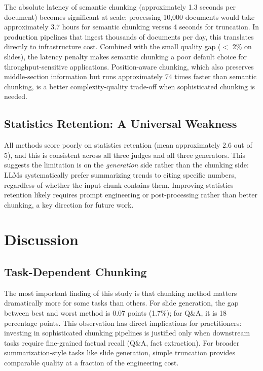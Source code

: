 \documentclass{ieeeaccess}
\begin{document}
The absolute latency of semantic chunking (approximately 1.3 seconds per document) becomes significant at scale: processing 10,000 documents would take approximately 3.7 hours for semantic chunking versus 4 seconds for truncation. In production pipelines that ingest thousands of documents per day, this translates directly to infrastructure cost. Combined with the small quality gap ($<$ 2\% on slides), the latency penalty makes semantic chunking a poor default choice for throughput-sensitive applications. Position-aware chunking, which also preserves middle-section information but runs approximately 74 times faster than semantic chunking, is a better complexity-quality trade-off when sophisticated chunking is needed.

\subsection{Statistics Retention: A Universal Weakness}

All methods score poorly on statistics retention (mean approximately 2.6 out of 5), and this is consistent across all three judges and all three generators. This suggests the limitation is on the \emph{generation} side rather than the chunking side: LLMs systematically prefer summarizing trends to citing specific numbers, regardless of whether the input chunk contains them. Improving statistics retention likely requires prompt engineering or post-processing rather than better chunking, a key direction for future work.

\section{Discussion}
\label{sec:discussion}

\subsection{Task-Dependent Chunking}

The most important finding of this study is that chunking method matters dramatically more for some tasks than others. For slide generation, the gap between best and worst method is 0.07 points (1.7\%); for Q\&A, it is 18 percentage points. This observation has direct implications for practitioners: investing in sophisticated chunking pipelines is justified only when downstream tasks require fine-grained factual recall (Q\&A, fact extraction). For broader summarization-style tasks like slide generation, simple truncation provides comparable quality at a fraction of the engineering cost.
\end{document}
